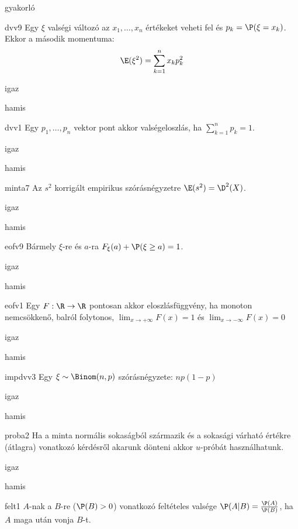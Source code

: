 \documentclass[12pt]{article}
\begin{document}
\begin{quiz}{gyakorló}
\begin{multi}[feedback={Def.}]{dvv9}
Egy $\xi$ valségi változó az $x_1,\ldots, x_n$ értékeket veheti fel és $p_k=\P(\xi=x_k)$. 
Ekkor a második momentuma:
$$
\E(\xi^2)=\sum_{k=1}^n x_k p_k^2
$$
\item igaz
\item* hamis
\end{multi}
\begin{multi}[feedback={Fontos a $p_k\ge 0$ is.}]{dvv1}
Egy $p_1,\ldots, p_n$ vektor pont akkor valségeloszlás, ha $\sum_{k=1}^n p_k=1$.
\item igaz
\item* hamis
\end{multi}
\begin{multi}[feedback={Az $s^2$ torzítatlan becslése a sokasági (elméleti) szórásnégyzetnek}]{minta7}
Az $s^2$ korrigált empirikus szórásnégyzetre $\E(s^2)=\D^2(X)$.
\item* igaz
\item hamis
\end{multi}
\begin{multi}[feedback={Komplementer események.}]{eofv9}
Bármely $\xi$-re és $a$-ra $F_{\xi}(a)+\P(\xi\ge a)=1$.
\item* igaz
\item hamis
\end{multi}
\begin{multi}[feedback={Def.}]{eofv1}
Egy $F:\R\to \R$ pontosan akkor eloszlásfüggvény, ha monoton nemcsökkenő, 
balról folytonos, $\lim_{x\to+\infty}F(x)=1$ és $\lim_{x\to-\infty}F(x)=0$
\item* igaz
\item hamis
\end{multi}
\begin{multi}[feedback={$\xi=\xi_1+\ldots+\xi_n$, ahol $\xi_k$ Bernoulli és $\E(\xi_k)=p$+$\E$-additívitása}]{impdvv3}
Egy $\xi\sim \Binom(n,p)$ szórásnégyzete: $np(1-p)$
\item* igaz
\item hamis
\end{multi}
\begin{multi}[feedback={A szórást ismerni kell.}]{proba2}
Ha a minta normális sokaságból származik és a sokasági várható értékre (átlagra) vonatkozó kérdésről 
akarunk dönteni akkor $u$-próbát használhatunk.
\item igaz
\item* hamis
\end{multi}
\begin{multi}[feedback={Def.+$P(AB)=P(A)$ a feltételekből.}]{felt1}
$A$-nak a $B$-re ($\P(B)>0$) vonatkozó feltételes valsége $\P(A|B)=\frac{\P(A)}{\P(B)}$, ha $A$ maga után vonja $B$-t.

\end{multi}
\end{quiz}
\end{document}
